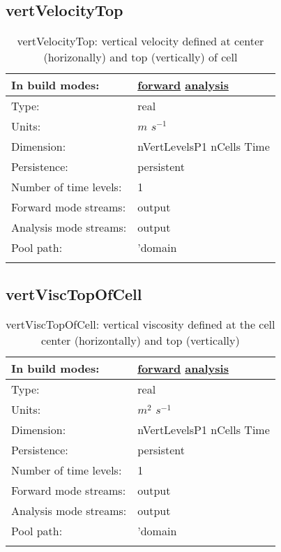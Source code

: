\subsection[vertVelocityTop]{vertVelocityTop}
\label{subsec:var_sec_diagnostics_vertVelocityTop}
\begin{center}
\begin{longtable}{| p{2.0in} | p{4.0in} |}
        \hline 
        In build modes: & \hyperref[subsec:forward_var_tab_diagnostics]{forward} \hyperref[subsec:analysis_var_tab_diagnostics]{analysis} \\
        \hline 
        Type: & real \\
        \hline 
        Units: & $m$ $s^{-1}$ \\
        \hline 
        Dimension: & nVertLevelsP1 nCells Time \\
        \hline 
        Persistence: & persistent \\
        \hline 
        Number of time levels: & 1 \\
        \hline 
		 Forward mode streams: &  output \\
        \hline 
		 Analysis mode streams: &  output \\
        \hline 
            Pool path: & 'domain %
 \\
		 \hline 
    \caption{vertVelocityTop: vertical velocity defined at center (horizonally) and top (vertically) of cell}
\end{longtable}
\end{center}
\subsection[vertViscTopOfCell]{vertViscTopOfCell}
\label{subsec:var_sec_diagnostics_vertViscTopOfCell}
\begin{center}
\begin{longtable}{| p{2.0in} | p{4.0in} |}
        \hline 
        In build modes: & \hyperref[subsec:forward_var_tab_diagnostics]{forward} \hyperref[subsec:analysis_var_tab_diagnostics]{analysis} \\
        \hline 
        Type: & real \\
        \hline 
        Units: & $m^2$ $s^{-1}$ \\
        \hline 
        Dimension: & nVertLevelsP1 nCells Time \\
        \hline 
        Persistence: & persistent \\
        \hline 
        Number of time levels: & 1 \\
        \hline 
		 Forward mode streams: &  output \\
        \hline 
		 Analysis mode streams: &  output \\
        \hline 
            Pool path: & 'domain %
 \\
		 \hline 
    \caption{vertViscTopOfCell: vertical viscosity defined at the cell center (horizontally) and top (vertically)}
\end{longtable}
\end{center}
